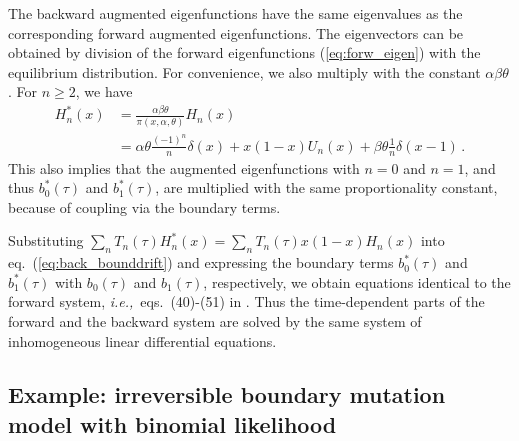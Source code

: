 \documentclass[preprint]{elsarticle}
\newcommand\ie{{\it i.e.,}}
\begin{document}
The backward augmented eigenfunctions have the same eigenvalues as the corresponding forward augmented eigenfunctions. The eigenvectors can be obtained by division of the forward eigenfunctions (\ref{eq:forw_eigen}) with the equilibrium distribution. For convenience, we also multiply with the constant ${\alpha\beta\theta}$. For $n\geq 2$, we have
\begin{equation}\label{eq:backw_eigen}
\begin{split}
    H_n^{*}(x)&= \frac{\alpha\beta\theta}{\pi(x, \alpha, \theta)} H_n(x)\\
    &=\alpha\theta\tfrac{(-1)^n}{ n}\delta(x)+x(1-x)U_n(x)+\beta\theta\tfrac{1}{n}\delta(x-1)\,.
\end{split}
\end{equation}
This also implies that the augmented eigenfunctions with $n=0$ and $n=1$, and thus $b_0^{*}(\tau)$ and $b_1^{*}(\tau)$, are multiplied with the same proportionality constant, because of coupling via the boundary terms. 

Substituting $\sum_n T_n(\tau)H_n^{*}(x)=\sum_n T_n(\tau)x(1-x)H_n(x)$ into eq.~(\ref{eq:back_bounddrift}) and expressing the boundary terms $b_0^{*}(\tau)$ and $b_1^{*}(\tau)$ with $b_0(\tau)$ and $b_1(\tau)$, respectively, we obtain equations identical to the forward system, \ie\ eqs.~(40)-(51) in \citet{Vogl16}. Thus the time-dependent parts of the forward and the backward system are solved by the same system of inhomogeneous linear differential equations. 

\subsection{Example: irreversible boundary mutation model with binomial likelihood}\label{section:irreversible_diffusion}
\end{document}
